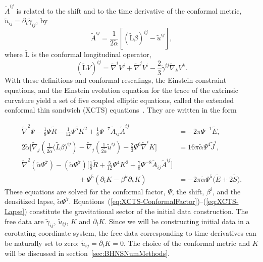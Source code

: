 $\tilde{A}^{ij}$ is related to the shift and to the time derivative of
the conformal metric, $\tilde{u}_{ij}=\partial_t\tilde{\gamma}_{ij}$,
by
\begin{equation}
\tilde{A}^{ij} =
\frac{1}{2\tilde{\alpha}}\left[\left(\tilde{\mathrm{L}}\beta\right)^{ij}-\tilde{u}^{ij}\right],
\end{equation}
where $\tilde{\mathrm{L}}$ is the conformal longitudinal operator,
\begin{equation}
\left(\tilde{\mathrm{L}}V\right)^{ij}=\tilde{\nabla}^iV^j + \tilde{\nabla}^jV^i
- \frac{2}{3}\tilde{\gamma}^{ij}\tilde{\nabla}_kV^k.
\end{equation}
With these definitions and conformal rescalings, the Einstein
constraint equations, and the Einstein evolution equation for the
trace of the extrinsic curvature yield a set of five coupled elliptic
equations, called the extended conformal thin sandwich (XCTS)
equations~\citep{Pfeiffer2003b}. They are written in the form


\begin{eqnarray}
\label{eq:XCTS-ConformalFactor}
\tilde{\nabla}^2\Psi - \frac{1}{8}\Psi\tilde{R} -
\frac{1}{12}\Psi^5K^2 
+\frac{1}{8}\Psi^{-7}\tilde{A}_{ij}\tilde{A}^{ij} &=-2\pi\Psi^{-1}\tilde{E},\\
\label{eq:XCTS-Shift}
2\tilde{\alpha}\bigg[\tilde{\nabla}_j\left(\frac{1}{2\tilde{\alpha}}\big(\tilde{L}\beta\big)^{ij}\right)-\tilde{\nabla}_j\left(\frac{1}{2\tilde{\alpha}}\tilde{u}^{ij}\right)
-\frac{2}{3}\Psi^6\tilde{\nabla}^iK\bigg] &=16\pi\tilde\alpha\Psi^4\tilde{J}^i,\\
\tilde{\nabla}^2\left(\tilde{\alpha}\Psi^7\right) -
\left(\tilde{\alpha}\Psi^7\right)\bigg[\frac{1}{8}\tilde{R}+\frac{5}{12}\Psi^4K^2+\frac{7}{8}\Psi^{-8}\tilde{A}_{ij}\tilde{A}^{ij} 
\bigg] \nonumber \\
\qquad\qquad\qquad\qquad+\Psi^5\left(\partial_{t}K- \beta^{k}\partial_kK\right)&=-2\pi\tilde\alpha\Psi^{5}\big(\tilde{E}+2\tilde{S}\big).
\label{eq:XCTS-Lapse}
\end{eqnarray}
These equations are solved for the conformal factor, $\Psi$, the
shift, $\beta^i$, and the densitized lapse, $\tilde\alpha\Psi^7$.
Equations~(\ref{eq:XCTS-ConformalFactor})--(\ref{eq:XCTS-Lapse})
constitute the gravitational sector of the initial data construction.
The free data are $\tilde{\gamma}_{ij}$, $\tilde{u}_{ij}$, $K$ and
$\partial_t K$. Since we will be constructing initial data in a
corotating coordinate system, the free data corresponding to
time-derivatives can be naturally set to zero:
$\tilde{u}_{ij}=\partial_t K=0$. The choice of the conformal metric
and $K$ will be discussed in section~\ref{sec:BHNSNumMethods}.

